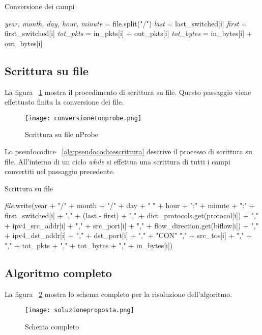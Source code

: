 \documentclass[../main.tex]{subfiles}
\begin{document}
\begin{algorithm}[H]
				\caption{Conversione dei campi}
				\label{alg:pseudocodiceconversione}
\begin{algorithmic}[1]
				\State \textit{year, month, day, hour, minute} = file.split("/") 
				\State \textit{last} = last\_switched[i]
				\State \textit{first} = first\_switched[i]
				\State \textit{tot\_pkts} = in\_pkts[i] + out\_pkts[i]
				\State \textit{tot\_bytes} = in\_bytes[i] + out\_bytes[i]
				\EndWhile
\end{algorithmic}
\end{algorithm}

\subsection{Scrittura su file}
La figura ~\ref{fig:conversionetonprobe} mostra il procedimento di scrittura su file. Questo passaggio viene effettuato finita la conversione dei file.
\begin{figure}[H]
				\centering
\texttt{[image: conversionetonprobe.png]}
				\caption{Scrittura su file nProbe}
				\label{fig:conversionetonprobe}
\end{figure}

Lo pseudocodice ~\ref{alg:pseudocodicescrittura} descrive il processo di scrittura su file. All'interno di un ciclo \textit{while} si effettua una scrittura di tutti i campi convertiti nel passaggio precedente.
\begin{algorithm}[H]
				\caption{Scrittura su file}
				\label{alg:pseudocodicescrittura}
\begin{algorithmic}[1]
				\State \textit{file}.write(year + "/" + month + "/" + day + " " + hour + ":" + minute + ":" + first\_switched[i] + "," + (last - first) + "," + dict\_protocols.get(protocol[i]) + "," + ipv4\_src\_addr[i] + "," + src\_port[i] + "," + flow\_direction.get(biflow[i]) + "," + ipv4\_dst\_addr[i] + "," + dst\_port[i] + "," + "CON" "," + src\_tos[i] + "," + "," + tot\_pkts + "," + tot\_bytes + "," + in\_bytes[i])
				\EndWhile
\end{algorithmic}
\end{algorithm}

\subsection{Algoritmo completo}
La figura ~\ref{fig:soluzioneproposta} mostra lo schema completo per la risoluzione dell'algoritmo.
\begin{figure}[H]
				\centering
\texttt{[image: soluzioneproposta.png]}
				\caption{Schema completo}
				\label{fig:soluzioneproposta}
\end{figure}
\end{document}

